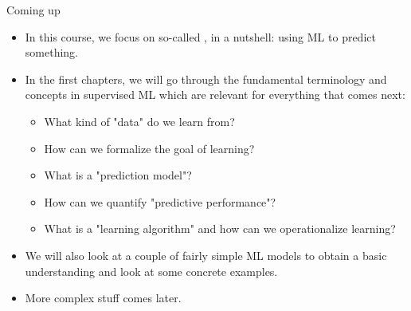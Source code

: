 \documentclass[11pt,compress,t,notes=noshow, xcolor=table]{beamer}
\begin{document}

\begin{frame}{Coming up}

\begin{itemize}

  \item In this course, we focus on so-called , in a 
  nutshell: using ML to predict something.
  
  \item In the first chapters, we will go through the fundamental terminology 
  and concepts in supervised ML which are relevant for everything that comes 
  next:
  
  \begin{itemize}
  
    \item What kind of "data" do we learn from?
    \item How can we formalize the goal of learning?
    \item What is a "prediction model"?
    \item How can we quantify "predictive performance"?
    \item What is a "learning algorithm" and how can we operationalize learning?
  
  \end{itemize}
  
  \item We will also look at a couple of fairly simple ML models to obtain a
  basic understanding and look at some concrete examples.
  
  \item More complex stuff comes later.
  
\end{itemize}

\end{frame}



\endlecture
\end{document}
